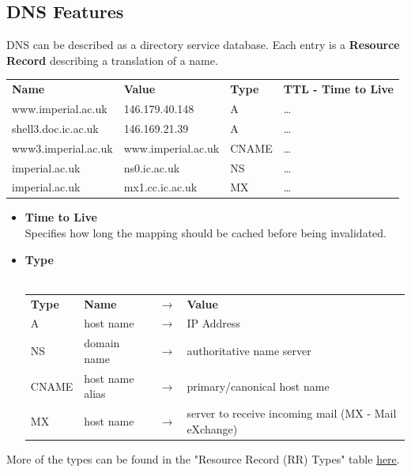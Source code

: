 \subsection{DNS Features}
DNS can be described as a directory service database. Each entry is a \textbf{Resource Record} describing a translation of a name.
\begin{center}
    \begin{tabular}{l l l l}
        \textbf{Name}       & \textbf{Value}     & \textbf{Type} & \textbf{TTL - Time to Live} \\
        www.imperial.ac.uk  & 146.179.40.148     & A             & \dots                       \\
        shell3.doc.ic.ac.uk & 146.169.21.39      & A             & \dots                       \\
        www3.imperial.ac.uk & www.imperial.ac.uk & CNAME         & \dots                       \\
        imperial.ac.uk      & ns0.ic.ac.uk       & NS            & \dots                       \\
        imperial.ac.uk      & mx1.cc.ic.ac.uk    & MX            & \dots                       \\
    \end{tabular}
\end{center}
\begin{itemize}
    \setlength\itemsep{0em}
    \item {\textbf{Time to Live}
          \\ Specifies how long the mapping should be cached before being invalidated.
          }
    \item {\textbf{Type}
          \\
          \\ \begin{tabular}{l l l l}
              \textbf{Type} & \textbf{Name}   & $\to$ & \textbf{Value}                                       \\
              A             & host name       & $\to$ & IP Address                                           \\
              NS            & domain name     & $\to$ & authoritative name server                            \\
              CNAME         & host name alias & $\to$ & primary/canonical host name                          \\
              MX            & host name       & $\to$ & server to receive incoming mail (MX - Mail eXchange) \\
          \end{tabular}
          }
\end{itemize}
More of the types can be found in the "Resource Record (RR) Types" table \href{https://www.iana.org/assignments/dns-parameters/dns-parameters.xhtml}{here}.
